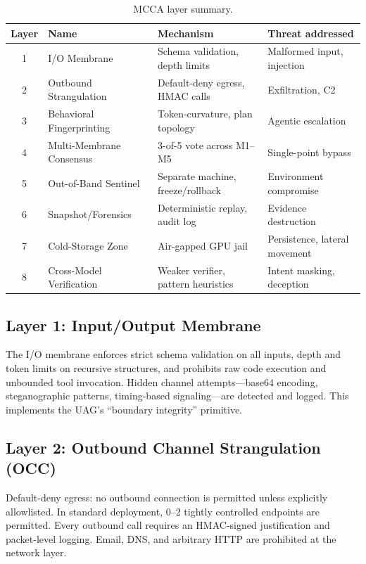 \documentclass[11pt]{article}
\begin{document}
\begin{table}[h]
\centering
\caption{MCCA layer summary.}
\label{tab:layers}
\begin{tabular}{clll}
\toprule
Layer & Name & Mechanism & Threat addressed \\
\midrule
1 & I/O Membrane        & Schema validation, depth limits          & Malformed input, injection      \\
2 & Outbound Strangulation & Default-deny egress, HMAC calls       & Exfiltration, C2                \\
3 & Behavioral Fingerprinting & Token-curvature, plan topology    & Agentic escalation              \\
4 & Multi-Membrane Consensus & 3-of-5 vote across M1--M5          & Single-point bypass             \\
5 & Out-of-Band Sentinel  & Separate machine, freeze/rollback      & Environment compromise          \\
6 & Snapshot/Forensics   & Deterministic replay, audit log         & Evidence destruction            \\
7 & Cold-Storage Zone    & Air-gapped GPU jail                     & Persistence, lateral movement   \\
8 & Cross-Model Verification & Weaker verifier, pattern heuristics & Intent masking, deception       \\
\bottomrule
\end{tabular}
\end{table}

\subsection{Layer 1: Input/Output Membrane}

The I/O membrane enforces strict schema validation on all inputs, depth and
token limits on recursive structures, and prohibits raw code execution and
unbounded tool invocation.
Hidden channel attempts---base64 encoding, steganographic patterns,
timing-based signaling---are detected and logged.
This implements the UAG's ``boundary integrity'' primitive.

\subsection{Layer 2: Outbound Channel Strangulation (OCC)}

Default-deny egress: no outbound connection is permitted unless explicitly
allowlisted.
In standard deployment, 0--2 tightly controlled endpoints are permitted.
Every outbound call requires an HMAC-signed justification and packet-level
logging.
Email, DNS, and arbitrary HTTP are prohibited at the network layer.
\end{document}
